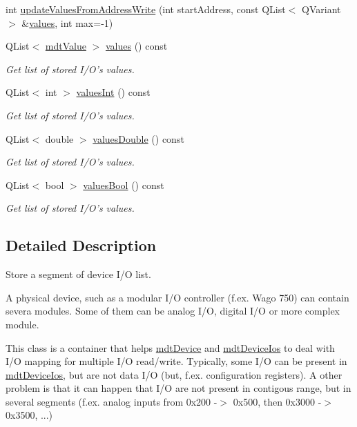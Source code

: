 \begin{DoxyCompactItemize}
int \hyperlink{classmdt_device_ios_segment_a06def14996b18b6dcaacaccd8b71f068}{update\-Values\-From\-Address\-Write} (int start\-Address, const Q\-List$<$ Q\-Variant $>$ \&\hyperlink{classmdt_device_ios_segment_a563da954d00404fbdaf45ea60a84b532}{values}, int max=-\/1)
\item 
Q\-List$<$ \hyperlink{classmdt_value}{mdt\-Value} $>$ \hyperlink{classmdt_device_ios_segment_a563da954d00404fbdaf45ea60a84b532}{values} () const 
\begin{DoxyCompactList}\small\item\em Get list of stored I/\-O's values. \end{DoxyCompactList}\item 
Q\-List$<$ int $>$ \hyperlink{classmdt_device_ios_segment_ad47f742a73846f86ab02c87f481a289d}{values\-Int} () const 
\begin{DoxyCompactList}\small\item\em Get list of stored I/\-O's values. \end{DoxyCompactList}\item 
Q\-List$<$ double $>$ \hyperlink{classmdt_device_ios_segment_abe79a9a7237ac22dd8bf619838225c4f}{values\-Double} () const 
\begin{DoxyCompactList}\small\item\em Get list of stored I/\-O's values. \end{DoxyCompactList}\item 
Q\-List$<$ bool $>$ \hyperlink{classmdt_device_ios_segment_a493547057946f012a8de06ac323bc869}{values\-Bool} () const 
\begin{DoxyCompactList}\small\item\em Get list of stored I/\-O's values. \end{DoxyCompactList}\end{DoxyCompactItemize}


\subsection{Detailed Description}
Store a segment of device I/\-O list. 

A physical device, such as a modular I/\-O controller (f.\-ex. Wago 750) can contain severa modules. Some of them can be analog I/\-O, digital I/\-O or more complex module.

This class is a container that helps \hyperlink{classmdt_device}{mdt\-Device} and \hyperlink{classmdt_device_ios}{mdt\-Device\-Ios} to deal with I/\-O mapping for multiple I/\-O read/write. Typically, some I/\-O can be present in \hyperlink{classmdt_device_ios}{mdt\-Device\-Ios}, but are not data I/\-O (but, f.\-ex. configuration registers). A other problem is that it can happen that I/\-O are not present in contigous range, but in several segments (f.\-ex. analog inputs from 0x200 -\/$>$ 0x500, then 0x3000 -\/$>$ 0x3500, ...) 

